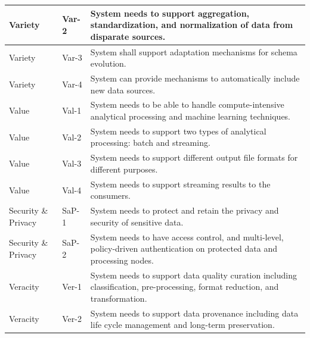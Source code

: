 \documentclass{ieeeaccess}
\begin{document}
\begin{table}
\begin{tabular}{|l|l|p{10cm}|}
  \hline

  Variety & Var-2 & System needs to support aggregation, standardization, and normalization of data from disparate sources. \\

  \hline

  Variety & Var-3 & System shall support adaptation mechanisms for schema evolution. \\

  \hline

  Variety & Var-4 & System can provide mechanisms to automatically include new data sources. \\

  \hline

  Value & Val-1 & System needs to be able to handle compute-intensive analytical processing and machine learning techniques. \\

  \hline

  Value & Val-2 & System needs to support two types of analytical processing: batch and streaming. \\

  \hline

  Value & Val-3 & System needs to support different output file formats for different purposes. \\

  \hline

  Value & Val-4 & System needs to support streaming results to the consumers. \\

  \hline

  Security \& Privacy & SaP-1 & System needs to protect and retain the privacy and security of sensitive data. \\

  \hline

  Security \& Privacy & SaP-2 & System needs to have access control, and multi-level, policy-driven authentication on protected data and processing nodes. \\

  \hline

  Veracity & Ver-1 & System needs to support data quality curation including classification, pre-processing, format reduction, and transformation. \\

  \hline

  Veracity & Ver-2 & System needs to support data provenance including data life cycle management and long-term preservation. \\

  \hline

  \end{tabular}

\end{table}
\end{document}
